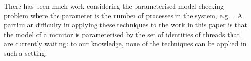 There has been much work considering the parameterised model checking problem
where the parameter is the number of processes in the system,
e.g.~\cite{Lubachevsky:1984, Clarke:1987, wolper-lovinfosse89,
  sistla-german92, EN1995, Pnueli:2002, tomasz-gavin-CA, AHH16, gavin:VA22}.
A particular difficulty in applying these techniques to the work in this
paper is that the model of a monitor is parameterised by the set of identities
of threads that are currently waiting: to our knowledge, none of the
techniques can be applied in such a setting.





